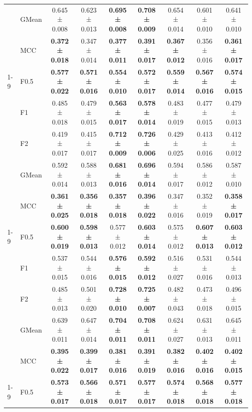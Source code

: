 \begin{table}[H]
{\begin{tabular}{llccccccc}
 & GMean & 0.645 ± 0.008 & 0.623 ± 0.013 & \textbf{0.695 ± 0.008} & \textbf{0.708 ± 0.009} & 0.654 ± 0.014 & 0.601 ± 0.010 & 0.641 ± 0.010 \\
 & MCC & \textbf{0.372 ± 0.018} & 0.347 ± 0.014 & \textbf{0.377 ± 0.011} & \textbf{0.391 ± 0.017} & \textbf{0.367 ± 0.012} & 0.356 ± 0.016 & \textbf{0.361 ± 0.017} \\
\cline{1-9}
\multirow[t]{5}{*}{RandomForest} & F0.5 & \textbf{0.577 ± 0.022} & \textbf{0.571 ± 0.016} & \textbf{0.554 ± 0.010} & \textbf{0.572 ± 0.017} & \textbf{0.559 ± 0.014} & \textbf{0.567 ± 0.016} & \textbf{0.574 ± 0.015} \\
 & F1 & 0.485 ± 0.018 & 0.479 ± 0.015 & \textbf{0.563 ± 0.017} & \textbf{0.578 ± 0.014} & 0.483 ± 0.019 & 0.477 ± 0.015 & 0.479 ± 0.013 \\
 & F2 & 0.419 ± 0.017 & 0.415 ± 0.017 & \textbf{0.712 ± 0.009} & \textbf{0.726 ± 0.006} & 0.429 ± 0.025 & 0.413 ± 0.016 & 0.412 ± 0.012 \\
 & GMean & 0.592 ± 0.014 & 0.588 ± 0.013 & \textbf{0.681 ± 0.016} & \textbf{0.696 ± 0.014} & 0.594 ± 0.017 & 0.586 ± 0.012 & 0.587 ± 0.010 \\
 & MCC & \textbf{0.361 ± 0.025} & \textbf{0.356 ± 0.018} & \textbf{0.357 ± 0.018} & \textbf{0.396 ± 0.022} & 0.347 ± 0.016 & 0.352 ± 0.019 & \textbf{0.358 ± 0.017} \\
\cline{1-9}
\multirow[t]{5}{*}{TabICL} & F0.5 & \textbf{0.600 ± 0.019} & \textbf{0.598 ± 0.013} & 0.577 ± 0.012 & \textbf{0.603 ± 0.014} & 0.575 ± 0.012 & \textbf{0.607 ± 0.013} & \textbf{0.603 ± 0.012} \\
 & F1 & 0.537 ± 0.015 & 0.544 ± 0.016 & \textbf{0.576 ± 0.015} & \textbf{0.592 ± 0.012} & 0.516 ± 0.027 & 0.531 ± 0.016 & 0.544 ± 0.013 \\
 & F2 & 0.485 ± 0.013 & 0.501 ± 0.020 & \textbf{0.728 ± 0.010} & \textbf{0.725 ± 0.007} & 0.482 ± 0.043 & 0.473 ± 0.018 & 0.496 ± 0.015 \\
 & GMean & 0.639 ± 0.011 & 0.647 ± 0.014 & \textbf{0.704 ± 0.011} & \textbf{0.708 ± 0.011} & 0.624 ± 0.027 & 0.631 ± 0.013 & 0.645 ± 0.011 \\
 & MCC & \textbf{0.395 ± 0.022} & \textbf{0.399 ± 0.017} & \textbf{0.381 ± 0.016} & \textbf{0.391 ± 0.019} & \textbf{0.382 ± 0.016} & \textbf{0.402 ± 0.016} & \textbf{0.402 ± 0.015} \\
\cline{1-9}
\multirow[t]{5}{*}{TabM} & F0.5 & \textbf{0.573 ± 0.017} & \textbf{0.566 ± 0.018} & \textbf{0.571 ± 0.017} & \textbf{0.577 ± 0.017} & \textbf{0.574 ± 0.018} & \textbf{0.568 ± 0.018} & \textbf{0.577 ± 0.018} \\

\end{tabular}}
\end{table}
